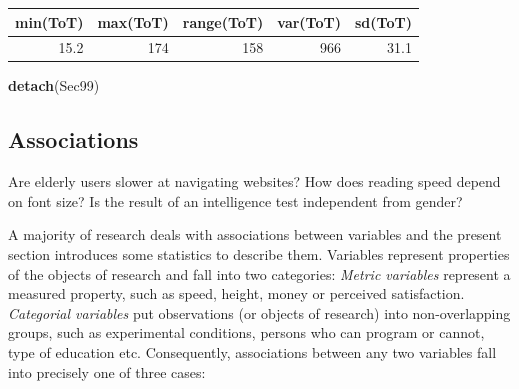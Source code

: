 \documentclass[]{svmono}
\newenvironment{Shaded}{\begin{snugshade}}{\end{snugshade}}
\newcommand{\KeywordTok}[1]{\textcolor[rgb]{0.13,0.29,0.53}{\textbf{#1}}}
\newcommand{\DecValTok}[1]{\textcolor[rgb]{0.00,0.00,0.81}{#1}}
\newcommand{\StringTok}[1]{\textcolor[rgb]{0.31,0.60,0.02}{#1}}
\newcommand{\ControlFlowTok}[1]{\textcolor[rgb]{0.13,0.29,0.53}{\textbf{#1}}}
\newcommand{\OperatorTok}[1]{\textcolor[rgb]{0.81,0.36,0.00}{\textbf{#1}}}
\newcommand{\NormalTok}[1]{#1}
\begin{document}
\begin{Shaded}
\end{Shaded}

\begin{tabular}{r|r|r|r|r}
\hline
min(ToT) & max(ToT) & range(ToT) & var(ToT) & sd(ToT)\\
\hline
15.2 & 174 & 158 & 966 & 31.1\\
\hline
\end{tabular}

\begin{Shaded}
\begin{Highlighting}[]
\KeywordTok{detach}\NormalTok{(Sec99)}
\end{Highlighting}
\end{Shaded}

\subsection{Associations}\label{associations}

Are elderly users slower at navigating websites? How does reading speed
depend on font size? Is the result of an intelligence test independent
from gender?

A majority of research deals with associations between variables and the
present section introduces some statistics to describe them. Variables
represent properties of the objects of research and fall into two
categories: \emph{Metric variables} represent a measured property, such
as speed, height, money or perceived satisfaction. \emph{Categorial
variables} put observations (or objects of research) into
non-overlapping groups, such as experimental conditions, persons who can
program or cannot, type of education etc. Consequently, associations
between any two variables fall into precisely one of three cases:
\end{document}
